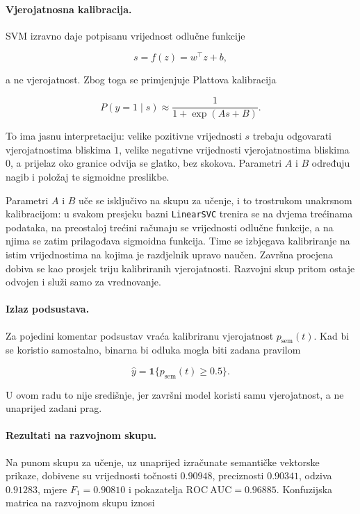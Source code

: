 \paragraph{Vjerojatnosna kalibracija.}
SVM izravno daje potpisanu vrijednost odlučne funkcije

\[
s=f(z)=w^\top z+b,
\]

a ne vjerojatnost. Zbog toga se primjenjuje Plattova kalibracija

\[
P(y=1\mid s)\approx \frac{1}{1+\exp(As+B)}.
\]

To ima jasnu interpretaciju: velike pozitivne vrijednosti $s$ trebaju odgovarati vjerojatnostima bliskima $1$, velike negativne vrijednosti vjerojatnostima bliskima $0$, a prijelaz oko granice odvija se glatko, bez skokova. Parametri $A$ i $B$ određuju nagib i položaj te sigmoidne preslikbe.

Parametri $A$ i $B$ uče se isključivo na skupu za učenje, i to trostrukom unakrsnom kalibracijom: u svakom presjeku bazni \texttt{LinearSVC} trenira se na dvjema trećinama podataka, na preostaloj trećini računaju se vrijednosti odlučne funkcije, a na njima se zatim prilagođava sigmoidna funkcija. Time se izbjegava kalibriranje na istim vrijednostima na kojima je razdjelnik upravo naučen. Završna procjena dobiva se kao prosjek triju kalibriranih vjerojatnosti. Razvojni skup pritom ostaje odvojen i služi samo za vrednovanje.

\paragraph{Izlaz podsustava.}
Za pojedini komentar podsustav vraća kalibriranu vjerojatnost $p_{\mathrm{sem}}(t)$. Kad bi se koristio samostalno, binarna bi odluka mogla biti zadana pravilom

\[
\hat y = \mathbf{1}\{p_{\mathrm{sem}}(t)\ge 0.5\}.
\]

U ovom radu to nije središnje, jer završni model koristi samu vjerojatnost, a ne unaprijed zadani prag.

\paragraph{Rezultati na razvojnom skupu.}
Na punom skupu za učenje, uz unaprijed izračunate semantičke vektorske prikaze, dobivene su vrijednosti točnosti $0.90948$, preciznosti $0.90341$, odziva $0.91283$, mjere $F_1=0.90810$ i pokazatelja $\mathrm{ROC\ AUC}=0.96885$. Konfuzijska matrica na razvojnom skupu iznosi


